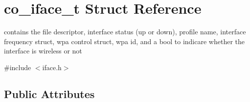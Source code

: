 \hypertarget{structco__iface__t}{\section{co\+\_\+iface\+\_\+t Struct Reference}
\label{structco__iface__t}
}


contains the file descriptor, interface status (up or down), profile name, interface frequency struct, wpa control struct, wpa id, and a bool to indicare whether the interface is wireless or not  




{\ttfamily \#include $<$iface.\+h$>$}

\subsection*{Public Attributes}
